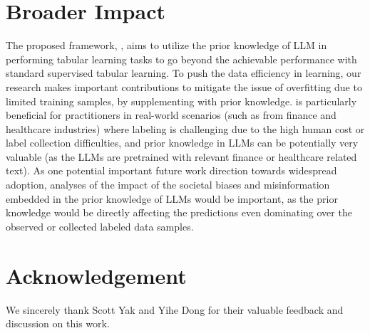 \documentclass{article}
\theoremstyle{plain}
\theoremstyle{definition}
\theoremstyle{remark}
\begin{document}
\section{Broader Impact}
The proposed framework, \model{}, aims to utilize the prior knowledge of LLM in performing tabular learning tasks to go beyond the achievable performance with standard supervised tabular learning. 
To push the data efficiency in learning, our research makes important contributions to mitigate the issue of overfitting due to limited training samples, by supplementing with prior knowledge. \model{} is particularly beneficial for practitioners in real-world scenarios (such as from finance and healthcare industries) where labeling is challenging due to the high human cost or label collection difficulties, and prior knowledge in LLMs can be potentially very valuable (as the LLMs are pretrained with relevant finance or healthcare related text). 
As one potential important future work direction towards widespread adoption, analyses of the impact of the societal biases and misinformation embedded in the prior knowledge of LLMs would be important, as the prior knowledge would be directly affecting the predictions even dominating over the observed or collected labeled data samples. 


\section*{Acknowledgement}
We sincerely thank Scott Yak and Yihe Dong for their valuable feedback and discussion on this work.



\end{document}
